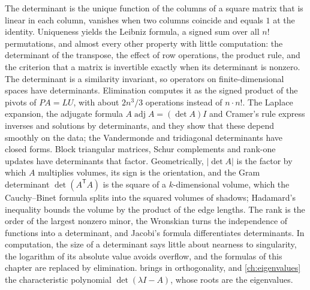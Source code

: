 \bigskip
The determinant is the unique function of the columns of a square matrix that is linear in each column, vanishes when two columns coincide and equals $1$ at the identity. Uniqueness yields the Leibniz formula, a signed sum over all $n!$ permutations, and almost every other property with little computation: the determinant of the transpose, the effect of row operations, the product rule, and the criterion that a matrix is invertible exactly when its determinant is nonzero. The determinant is a similarity invariant, so operators on finite-dimensional spaces have determinants. Elimination computes it as the signed product of the pivots of $PA=LU$, with about $2n^3/3$ operations instead of $n\cdot n!$. The Laplace expansion, the adjugate formula $A\operatorname{adj}A=(\det A)I$ and Cramer's rule express inverses and solutions by determinants, and they show that these depend smoothly on the data; the Vandermonde and tridiagonal determinants have closed forms. Block triangular matrices, Schur complements and rank-one updates have determinants that factor. Geometrically, $|\det A|$ is the factor by which $A$ multiplies volumes, its sign is the orientation, and the Gram determinant $\det(A^{\mathsf T}A)$ is the square of a $k$-dimensional volume, which the Cauchy--Binet formula splits into the squared volumes of shadows; Hadamard's inequality bounds the volume by the product of the edge lengths. The rank is the order of the largest nonzero minor, the Wronskian turns the independence of functions into a determinant, and Jacobi's formula differentiates determinants. In computation, the size of a determinant says little about nearness to singularity, the logarithm of its absolute value avoids overflow, and the formulas of this chapter are replaced by elimination.  brings in orthogonality, and \cref{ch:eigenvalues} the characteristic polynomial $\det(\lambda I-A)$, whose roots are the eigenvalues.

\chapternotes

